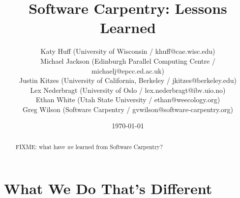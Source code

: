 \documentclass{article}
\begin{document}
\title{Software Carpentry: Lessons Learned}
\date{\today}

\author{
  Katy Huff (University of  Wisconsin / khuff@cae.wisc.edu)\\
  Michael Jackson (Edinburgh Parallel Computing Centre / michaelj@epcc.ed.ac.uk)\\
  Justin Kitzes (University of California, Berkeley / jkitzes@berkeley.edu)\\
  Lex Nederbragt (University of Oslo / lex.nederbragt@ibv.uio.no)\\
  Ethan White (Utah State University / ethan@weecology.org)\\
  Greg Wilson (Software Carpentry / gvwilson@software-carpentry.org)
}

\maketitle

\begin{abstract}
FIXME: what have \emph{we} learned from Software Carpentry?
\end{abstract}

\section{What We Do That's Different}
\end{document}
